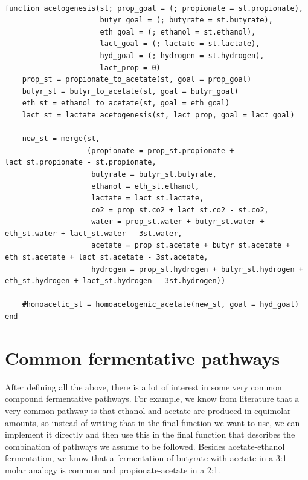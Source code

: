 \documentclass[11pt]{article}
\begin{document}
\begin{verbatim}

function acetogenesis(st; prop_goal = (; propionate = st.propionate),
                      butyr_goal = (; butyrate = st.butyrate),
                      eth_goal = (; ethanol = st.ethanol),
                      lact_goal = (; lactate = st.lactate),
                      hyd_goal = (; hydrogen = st.hydrogen),
                      lact_prop = 0)
    prop_st = propionate_to_acetate(st, goal = prop_goal)
    butyr_st = butyr_to_acetate(st, goal = butyr_goal)
    eth_st = ethanol_to_acetate(st, goal = eth_goal)
    lact_st = lactate_acetogenesis(st, lact_prop, goal = lact_goal)

    new_st = merge(st,
                   (propionate = prop_st.propionate + lact_st.propionate - st.propionate,
                    butyrate = butyr_st.butyrate,
                    ethanol = eth_st.ethanol,
                    lactate = lact_st.lactate,
                    co2 = prop_st.co2 + lact_st.co2 - st.co2,
                    water = prop_st.water + butyr_st.water + eth_st.water + lact_st.water - 3st.water,
                    acetate = prop_st.acetate + butyr_st.acetate + eth_st.acetate + lact_st.acetate - 3st.acetate,
                    hydrogen = prop_st.hydrogen + butyr_st.hydrogen + eth_st.hydrogen + lact_st.hydrogen - 3st.hydrogen))

    #homoacetic_st = homoacetogenic_acetate(new_st, goal = hyd_goal)
end

\end{verbatim}

\section{Common fermentative pathways}
\label{sec:orgcb6c0ab}
After defining all the above, there is a lot of interest in some very common compound fermentative pathways. For example, we know from literature that a very common pathway is that ethanol and acetate are produced in equimolar amounts, so instead of writing that in the final function we want to use, we can implement it directly and then use this in the final function that describes the combination of pathways we assume to be followed. Besides acetate-ethanol fermentation, we know that a fermentation of butyrate with acetate in a 3:1 molar analogy is common and propionate-acetate in a 2:1.
\end{document}
